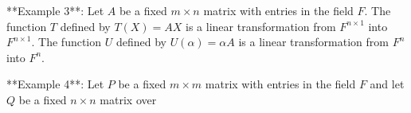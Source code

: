 

**Example 3**: Let \(A\) be a fixed \(m\times n\) matrix with entries in the field \(F\). The function \(T\) defined by \(T(X)=AX\) is a linear transformation from \(F^{n\times 1}\) into \(F^{n\times 1}\). The function \(U\) defined by \(U(\alpha)=\alpha A\) is a linear transformation from \(F^{n}\) into \(F^{n}\).

**Example 4**: Let \(P\) be a fixed \(m\times m\) matrix with entries in the field \(F\) and let \(Q\) be a fixed \(n\times n\) matrix over